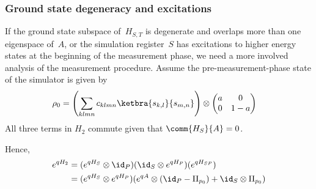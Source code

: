 \documentclass[11pt,oneside,final]{huthesis}%
\begin{document}
\subsubsection*{Ground state degeneracy and excitations}

If the ground state subspace of~$H_{S,T}$ is degenerate and overlaps
more than one eigenspace of~$A$, or
the simulation register~$S$ has excitations to higher
energy states at the beginning of the measurement phase, we need a
more involved analysis of the measurement procedure.
Assume the pre-measurement-phase state of the simulator is given by
\begin{align}
\rho_0
&= \left(\sum_{klmn} c_{klmn}\ketbra{s_{k,l}}{s_{m,n}} \right) \otimes 
\begin{pmatrix}
a & 0\\
0 & 1-a
\end{pmatrix}
\end{align}
All three terms in $H_2$ commute given that $\comm{H_{S}}{A} = 0$.

Hence,
\begin{align}
\notag
e^{qH_2}
&= (e^{qH_{S}}\otimes \id_P)(\id_S \otimes e^{qH_P})(e^{qH_{SP}})\\
&= (e^{qH_{S}} \otimes e^{qH_P})
(e^{qA} \otimes (\id_P -\Pi_{p_0}) +\id_S \otimes \Pi_{p_0})
\end{align}
\end{document}
